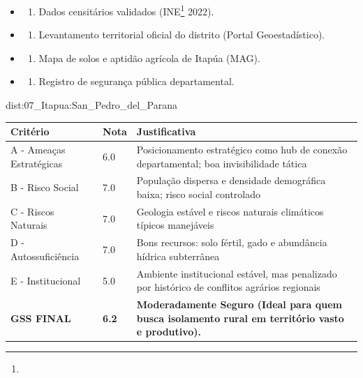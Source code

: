 {\begin{itemize}
\tightlist
\item
  \begin{enumerate}
  \def\labelenumi{\arabic{enumi})}
  \tightlist
  \item
    Dados censitários validados (INE\footnote{\fineINE} 2022).
  \end{enumerate}
\item
  \begin{enumerate}
  \def\labelenumi{\arabic{enumi})}
  \setcounter{enumi}{1}
  \tightlist
  \item
    Levantamento territorial oficial do distrito (Portal
    Geoestadístico).
  \end{enumerate}
\item
  \begin{enumerate}
  \def\labelenumi{\arabic{enumi})}
  \setcounter{enumi}{2}
  \tightlist
  \item
    Mapa de solos e aptidão agrícola de Itapúa (MAG).
  \end{enumerate}
\item
  \begin{enumerate}
  \def\labelenumi{\arabic{enumi})}
  \setcounter{enumi}{3}
  \tightlist
  \item
    Registro de segurança pública departamental.
  \end{enumerate}
\end{itemize}}{dist:07_Itapua:San_Pedro_del_Parana}
\begin{table}[ht!]
\small \begin{tabular}{p{3.0cm}p{0.8cm}p{6.0cm}} \toprule
\textbf{Critério} & \textbf{Nota} & \textbf{Justificativa} \\ \midrule
A - Ameaças Estratégicas & 6.0 & Posicionamento estratégico como hub de conexão departamental; boa invisibilidade tática \\
B - Risco Social & 7.0 & População dispersa e densidade demográfica baixa; risco social controlado \\
C - Riscos Naturais & 7.0 & Geologia estável e riscos naturais climáticos típicos manejáveis \\
D - Autossuficiência & 7.0 & Bons recursos: solo fértil, gado e abundância hídrica subterrânea \\
E - Institucional & 5.0 & Ambiente institucional estável, mas penalizado por histórico de conflitos agrários regionais \\
\midrule \textbf{GSS FINAL} & \textbf{6.2} & \textbf{Moderadamente Seguro (Ideal para quem busca isolamento rural em território vasto e produtivo).} \\ \bottomrule \end{tabular}
\end{table}

